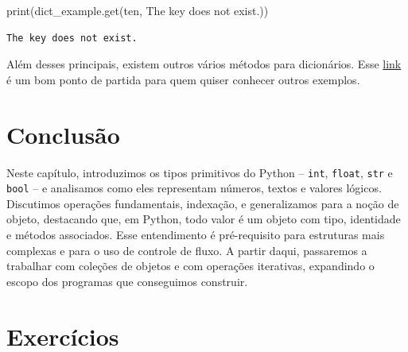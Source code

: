 \documentclass[
  brazilian,
  letterpaper,
  DIV=11,
  numbers=noendperiod]{scrreprt}
\newenvironment{Shaded}{\begin{snugshade}}{\end{snugshade}}
\newcommand{\BuiltInTok}[1]{\textcolor[rgb]{0.00,0.23,0.31}{#1}}
\newcommand{\NormalTok}[1]{\textcolor[rgb]{0.00,0.23,0.31}{#1}}
\newcommand{\StringTok}[1]{\textcolor[rgb]{0.13,0.47,0.30}{#1}}
\begin{document}
\begin{Shaded}
\begin{Highlighting}[]
\BuiltInTok{print}\NormalTok{(dict\_example.get(}\StringTok{\textquotesingle{}ten\textquotesingle{}}\NormalTok{, }\StringTok{\textquotesingle{}The key does not exist.\textquotesingle{}}\NormalTok{))}
\end{Highlighting}
\end{Shaded}

\begin{verbatim}
The key does not exist.
\end{verbatim}

Além desses principais, existem outros vários métodos para dicionários.
Esse
\href{https://www.geeksforgeeks.org/python-dictionary-methods/}{link} é
um bom ponto de partida para quem quiser conhecer outros exemplos.

\section{Conclusão}\label{conclusuxe3o-3}

Neste capítulo, introduzimos os tipos primitivos do Python --
\texttt{int}, \texttt{float}, \texttt{str} e \texttt{bool} -- e
analisamos como eles representam números, textos e valores lógicos.
Discutimos operações fundamentais, indexação, e generalizamos para a
noção de objeto, destacando que, em Python, todo valor é um objeto com
tipo, identidade e métodos associados. Esse entendimento é pré-requisito
para estruturas mais complexas e para o uso de controle de fluxo. A
partir daqui, passaremos a trabalhar com coleções de objetos e com
operações iterativas, expandindo o escopo dos programas que conseguimos
construir.

\section{Exercícios}\label{exercuxedcios-3}
\end{document}
